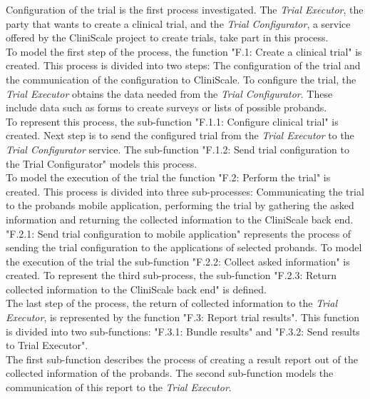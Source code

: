 Configuration of the trial is the first process investigated. The \textit{Trial Executor}, the party that wants to create a clinical trial, and the \textit{Trial Configurator}, a service offered by the CliniScale project to create trials, take part in this process.\\
To model the first step of the process, the function "F.1: Create a clinical trial" is created.
This process is divided into two steps: The configuration of the trial and the communication of the configuration to CliniScale. 
To configure the trial, the \textit{Trial Executor} obtains the data needed from the \textit{Trial Configurator}. These include data such as forms to create surveys or lists of possible probands. \\
To represent this process, the sub-function "F.1.1: Configure clinical trial" is created.
Next step is to send the configured trial from the \textit{Trial Executor} to the \textit{Trial Configurator} service. The sub-function "F.1.2: Send trial configuration to the Trial Configurator" models this process.\\
\newline
To model the execution of the trial the function "F.2: Perform the trial" is created. This process is divided into three sub-processes: Communicating the trial to the probands mobile application, performing the trial by gathering the asked information and returning the collected information to the CliniScale back end.\\
"F.2.1: Send trial configuration to mobile application" represents the process of sending the trial configuration to the applications of selected probands. To model the execution of the trial the sub-function "F.2.2: Collect asked information" is created.
To represent the third sub-process, the sub-function "F.2.3: Return collected information to the CliniScale back end" is defined.\\
\newline
The last step of the process, the return of collected information to the \textit{Trial Executor}, is represented by the function "F.3: Report trial results". This function is divided into two sub-functions: "F.3.1: Bundle results" and "F.3.2: Send results to Trial Executor".\\
The first sub-function describes the process of creating a result report out of the collected information of the probands. The second sub-function models the communication of this report to the \textit{Trial Executor}.

